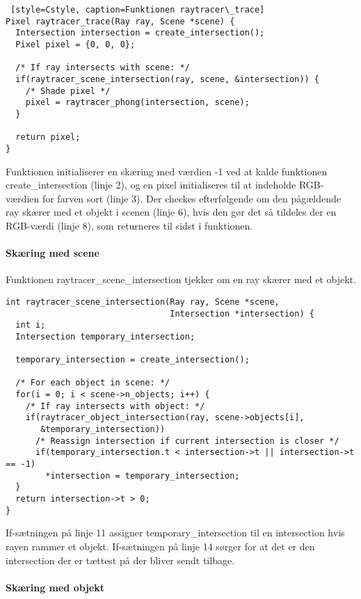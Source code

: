\begin{lstlisting} [style=Cstyle, caption=Funktionen raytracer\_trace]
Pixel raytracer_trace(Ray ray, Scene *scene) {
  Intersection intersection = create_intersection();
  Pixel pixel = {0, 0, 0};
  
  /* If ray intersects with scene: */
  if(raytracer_scene_intersection(ray, scene, &intersection)) {
    /* Shade pixel */
    pixel = raytracer_phong(intersection, scene);
  }
  
  return pixel;
}
\end{lstlisting}
Funktionen initialiserer en skæring med værdien -1 ved at kalde funktionen create\_intersection (linje 2), og en pixel initialiseres til at indeholde RGB-værdien for farven sort (linje 3). Der checkes efterfølgende om den pågældende ray skærer med et objekt i scenen (linje 6), hvis den gør det så tildeles der en RGB-værdi (linje 8), som returneres til sidst i funktionen. 

\paragraph{Skæring med scene}

Funktionen raytracer\_scene\_intersection tjekker om en ray skærer med et objekt.

\begin{lstlisting}[style=Cstyle, caption=Funktionen raytracer\_scene\_intersection]
int raytracer_scene_intersection(Ray ray, Scene *scene, 
                                 Intersection *intersection) {
  int i;
  Intersection temporary_intersection;

  temporary_intersection = create_intersection();

  /* For each object in scene: */
  for(i = 0; i < scene->n_objects; i++) {
    /* If ray intersects with object: */
    if(raytracer_object_intersection(ray, scene->objects[i], 
       &temporary_intersection))
      /* Reassign intersection if current intersection is closer */
      if(temporary_intersection.t < intersection->t || intersection->t == -1)
        *intersection = temporary_intersection;
  }
  return intersection->t > 0;
}
\end{lstlisting}

If-sætningen på linje 11 assigner temporary\_intersection til en intersection hvis rayen rammer et objekt. If-sætningen på linje 14 sørger for at det er den intersection der er tættest på der bliver sendt tilbage. 


\paragraph{Skæring med objekt}

